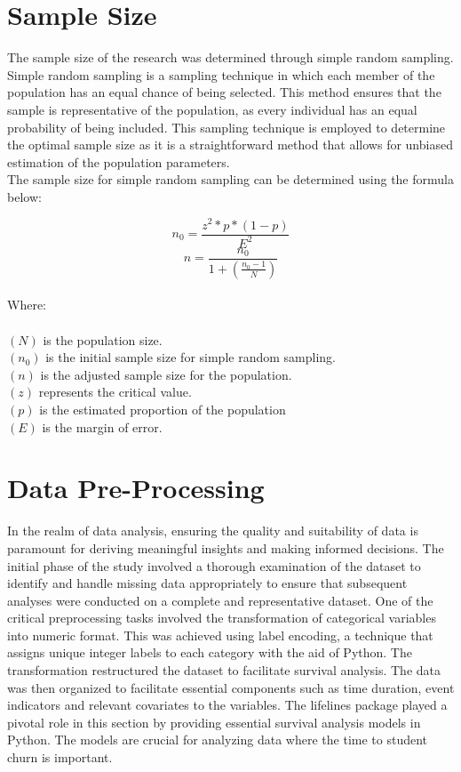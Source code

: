 \documentclass[doublespacing,12pt]{report}
\begin{document}
\section{Sample Size}
The sample size of the research was determined through simple random sampling. Simple random sampling is a sampling technique in which each member of the population has an equal chance of being selected. This method ensures that the sample is representative of the population, as every individual has an equal probability of being included. This sampling technique is employed to determine the optimal sample size as it is a straightforward method that allows for unbiased estimation of the population parameters.\\
The sample size for simple random sampling can be determined using the formula below:

\begin{equation}
n_0=\frac{z^2 \ast p \ast \left(1-p\right)}{E^2}
\end{equation}
\begin{equation}
n=\frac{n_0}{1+(\frac{n_0-1}{N})}
\end{equation}\\
Where:\\
\\
  \((N)\) is the population size.\\
  \((n_0)\) is the initial sample size for simple random sampling.\\
   \((n)\) is the adjusted sample size for the population.\\
  \((z)\) represents the critical value.\\
  \((p)\) is the estimated proportion of the population\\
 \((E)\) is the margin of error.\\

 

\section{Data Pre-Processing}

In the realm of data analysis, ensuring the quality and suitability of data is paramount for deriving meaningful insights and making informed decisions. The initial phase of the study involved a thorough examination of the dataset to identify and handle missing data appropriately to ensure that subsequent analyses were conducted on a complete and representative dataset. One of the critical preprocessing tasks involved the transformation of categorical variables into numeric format. This was achieved using label encoding, a technique that assigns unique integer labels to each category with the aid of Python. The transformation restructured the dataset to facilitate survival analysis. The data was then organized to facilitate essential components such as time duration, event indicators and relevant covariates to the variables. 
The lifelines package played a pivotal role in this section by providing essential survival analysis models in Python. The models are crucial for analyzing data where the time to student churn is important. 
\end{document}
